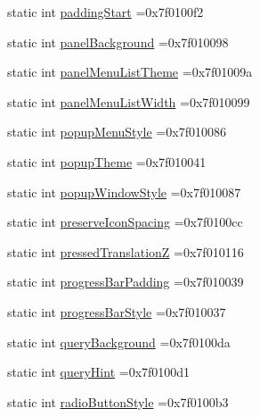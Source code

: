 \begin{DoxyCompactItemize}
static int \hyperlink{classandroid_1_1support_1_1v7_1_1appcompat_1_1R_1_1attr_ad5d87fd81512a9d000e393f93e56bfd4}{padding\+Start} =0x7f0100f2
\item 
static int \hyperlink{classandroid_1_1support_1_1v7_1_1appcompat_1_1R_1_1attr_a8d488539e6d98782d46baa1724a9324b}{panel\+Background} =0x7f010098
\item 
static int \hyperlink{classandroid_1_1support_1_1v7_1_1appcompat_1_1R_1_1attr_a5d9c2e215ca4e27e12fafdb186c0dc53}{panel\+Menu\+List\+Theme} =0x7f01009a
\item 
static int \hyperlink{classandroid_1_1support_1_1v7_1_1appcompat_1_1R_1_1attr_afe6be40bd1264ce4e4d1ea09fbdd9935}{panel\+Menu\+List\+Width} =0x7f010099
\item 
static int \hyperlink{classandroid_1_1support_1_1v7_1_1appcompat_1_1R_1_1attr_adaf268c570b00062a1054b7f97f96b38}{popup\+Menu\+Style} =0x7f010086
\item 
static int \hyperlink{classandroid_1_1support_1_1v7_1_1appcompat_1_1R_1_1attr_a7163bdfa188237fc5f6cb7ec583125e4}{popup\+Theme} =0x7f010041
\item 
static int \hyperlink{classandroid_1_1support_1_1v7_1_1appcompat_1_1R_1_1attr_a5b684a34260eff69eb7de3101f52d178}{popup\+Window\+Style} =0x7f010087
\item 
static int \hyperlink{classandroid_1_1support_1_1v7_1_1appcompat_1_1R_1_1attr_abe233b217b211968e10d98d011e83813}{preserve\+Icon\+Spacing} =0x7f0100cc
\item 
static int \hyperlink{classandroid_1_1support_1_1v7_1_1appcompat_1_1R_1_1attr_a01bd72cc6ce7f445291fc2c14a64a7e3}{pressed\+TranslationZ} =0x7f010116
\item 
static int \hyperlink{classandroid_1_1support_1_1v7_1_1appcompat_1_1R_1_1attr_a8538b6aa3f3da37516587bcb65e85d3a}{progress\+Bar\+Padding} =0x7f010039
\item 
static int \hyperlink{classandroid_1_1support_1_1v7_1_1appcompat_1_1R_1_1attr_abd2e9f1977b38a07341c90beac08fe98}{progress\+Bar\+Style} =0x7f010037
\item 
static int \hyperlink{classandroid_1_1support_1_1v7_1_1appcompat_1_1R_1_1attr_a99efbff6d3c68cf5516d7ec329aaf55b}{query\+Background} =0x7f0100da
\item 
static int \hyperlink{classandroid_1_1support_1_1v7_1_1appcompat_1_1R_1_1attr_a8b9b50a850d6c45d35817e80f50f33f4}{query\+Hint} =0x7f0100d1
\item 
static int \hyperlink{classandroid_1_1support_1_1v7_1_1appcompat_1_1R_1_1attr_a39f3d965b1f9c2b0ccff53d00870df43}{radio\+Button\+Style} =0x7f0100b3

\end{DoxyCompactItemize}
